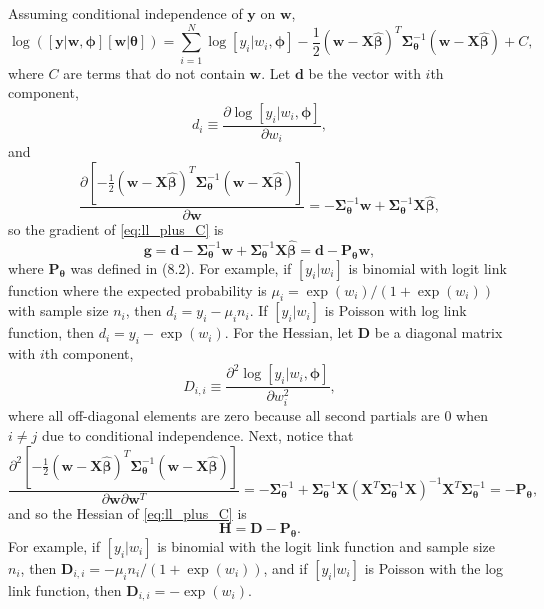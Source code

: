 \documentclass[12pt, titlepage]{article}
\begin{document}
Assuming conditional independence of $\mathbf{y}$ on $\mathbf{w}$,
\begin{equation} \label{eq:ll_plus_C}
\log([\mathbf{y}|\mathbf{w},\boldsymbol{\phi}][\mathbf{w}|\boldsymbol{\theta}]) = \sum_{i = 1}^N \log[y_i|w_i,\boldsymbol{\phi}] - \frac{1}{2}(\mathbf{w} - \mathbf{X}\hat{\boldsymbol{\beta}})^{T}\boldsymbol{\Sigma}_{\boldsymbol{\theta}}^{-1}(\mathbf{w} - \mathbf{X}\hat{\boldsymbol{\beta}}) + C,
\end{equation}
where $C$ are terms that do not contain $\mathbf{w}$. Let $\mathbf{d}$ be the vector with $i$th component,
$$
d_{i} \equiv \frac{\partial\log[y_i|w_i,\boldsymbol{\phi}]}{\partial w_i},
$$
and
$$
\frac{\partial [-\frac{1}{2}(\mathbf{w} - \mathbf{X}\hat{\boldsymbol{\beta}})^{T}\boldsymbol{\Sigma}_{\boldsymbol{\theta}}^{-1}(\mathbf{w} - \mathbf{X}\hat{\boldsymbol{\beta}})]}{\partial \mathbf{w}} = -\boldsymbol{\Sigma}_{\boldsymbol{\theta}}^{-1}\mathbf{w} + \boldsymbol{\Sigma}_{\boldsymbol{\theta}}^{-1}\boldsymbol{X}\hat{\boldsymbol{\beta}},
$$
so the gradient of \eqref{eq:ll_plus_C} is
$$
\mathbf{g} = \mathbf{d} - \boldsymbol{\Sigma}_{\boldsymbol{\theta}}^{-1}\mathbf{w} + \boldsymbol{\Sigma}_{\boldsymbol{\theta}}^{-1}\mathbf{X}\hat{\boldsymbol{\beta}} = \mathbf{d} - \mathbf{P}_{\boldsymbol{\theta}}\mathbf{w},
$$
where $\mathbf{P}_{\boldsymbol{\theta}}$ was defined in (8.2). For example, if $[y_i|w_i]$ is binomial with logit link function where the expected probability is $\mu_{i} = \exp(w_{i})/(1 + \exp(w_{i}))$ with sample size $n_{i}$, then $d_{i} = y_i - \mu_{i}n_i$.  If $[y_i|w_i]$ is Poisson with log link function, then $d_{i} = y_{i} - \exp(w_{i})$. For the Hessian, let $\mathbf{D}$ be a diagonal matrix with $i$th component,
$$
D_{i,i} \equiv \frac{\partial^2\log[y_i|w_i,\boldsymbol{\phi}]}{\partial w_i^2},
$$
where all off-diagonal elements are zero because all second partials are 0 when $i \neq j$ due to conditional independence. Next, notice that
$$
\frac{\partial^2 [-\frac{1}{2}(\mathbf{w} - \mathbf{X}\hat{\boldsymbol{\beta}})^{T}\boldsymbol{\Sigma}_{\boldsymbol{\theta}}^{-1}(\mathbf{w} - \mathbf{X}\hat{\boldsymbol{\beta}})] }{\partial \mathbf{w} \partial \mathbf{w}^{T}} =
	-\boldsymbol{\Sigma}_{\boldsymbol{\theta}}^{-1} + \boldsymbol{\Sigma}_{\boldsymbol{\theta}}^{-1}\mathbf{X}(\mathbf{X}^{T}\boldsymbol{\Sigma}_{\boldsymbol{\theta}}^{-1}\mathbf{X})^{-1}\mathbf{X}^{T}\boldsymbol{\Sigma}_{\boldsymbol{\theta}}^{-1} = -\mathbf{P}_{\boldsymbol{\theta}},
$$
and so the Hessian of \eqref{eq:ll_plus_C} is
\begin{equation} \label{eq:Hdef}
\mathbf{H} = \mathbf{D} -\mathbf{P}_{\boldsymbol{\theta}}.
\end{equation}
For example, if $[y_i|w_i]$ is binomial with the logit link function and sample size $n_{i}$, then $\mathbf{D}_{i,i} = -\mu_i n_i/(1 + \exp(w_i))$, and if $[y_i|w_i]$ is Poisson with the log link function, then $\mathbf{D}_{i,i} = -\exp(w_i)$.
\end{document}
